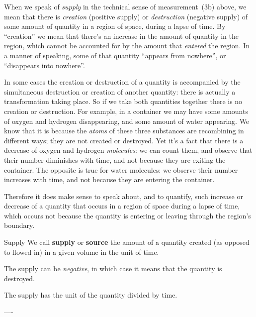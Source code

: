 When we speak of \emph{supply} in the technical sense of measurement~(3b) above, we mean that there is \emph{creation} (positive supply) or \emph{destruction} (negative supply) of some amount of quantity in a region of space, during a lapse of time. By \enquote{creation} we mean that there's an increase in the amount of quantity in the region, which cannot be accounted for by the amount that \emph{entered} the region. In a manner of speaking, some of that quantity \enquote{appears from nowhere}, or \enquote{disappears into nowhere}.

In some cases the creation or destruction of a quantity is accompanied by the simultaneous destruction or creation of another quantity: there is actually a transformation taking place. So if we take both quantities together there is no creation or destruction. For example, in a container we may have some amounts of oxygen and hydrogen disappearing, and some amount of water appearing. We know that it is because the \emph{atoms} of these three substances are recombining in different ways; they are not created or destroyed. Yet it's a fact that there is a decrease of oxygen and hydrogen \emph{molecules}: we can count them, and observe that their number diminishes with time, and not because they are exiting the container. The opposite is true for water molecules: we observe their number increases with time, and not because they are entering the container.

Therefore it does make sense to speak about, and to quantify, such increase or decrease of a quantity that occurs in a region of space during a lapse of time, which occurs not because the quantity is entering or leaving through the region's boundary. %
\begin{definition}{Supply}
  We call \textbf{supply} or \textbf{source} the amount of a quantity created (as opposed to flowed in) in a given volume in the unit of time.

  The supply can be \emph{negative}, in which case it means that the quantity is destroyed.

  The supply has the unit of the quantity divided by time.
\end{definition}

\medskip


----

